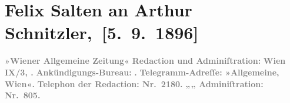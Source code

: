 

         
         \renewcommand{\erwaehntePersonen}{Personen: Ferdinand Raimund, Felix Salten, Julian Sternberg}
         \renewcommand{\erwaehnteInstitutionen}{Institutionen: Südbahnstrecke, Wiener Allgemeine Zeitung}
         \renewcommand{\erwaehnteOrte}{Orte: Raimund-Theater, Schulerstraße, Universitätsstraße, Wien}
         \renewcommand{\erwaehnteWerke}{Werke: Das Mädchen aus der Feenwelt oder Der Bauer als Millionär}
               \section[ Felix Salten an Arthur Schnitzler, {[}5. 9. 1896{]}]{ Felix Salten an Arthur Schnitzler, {[}5. 9. 1896{]}}\nopagebreak{}\rehead{ }\begin{ledgroupsized}[t]{13cm}\normalsize\beginnumbering \toendnotes[C]{\smallbreak\pagebreak[2]} 
\toendnotes[C]{\smallbreak}\pstart
           \noindent{}{\pb}\textcolor{gray}{\textbf{\textbf{»Wiener Allgemeine
                        Zeitung«}}}\pend
           \pstart
           \textcolor{gray}{\textbf{Redaction und Adminiſtration:}}\pend
           \pstart
           \textcolor{gray}{\textbf{Wien}}\pend
           \pstart
           \textcolor{gray}{\textbf{\textbf{IX}/3,{ }\textbf{}\textbf{.}}}\pend
           \pstart
           \textcolor{gray}{\textbf{Ankündigungs-Bureau:}}\pend
           \pstart
           \textcolor{gray}{\textbf{\textbf{.
                     }}}\pend
           \pstart
           \textcolor{gray}{\textbf{Telegramm-Adreſſe: »Allgemeine, Wien«.}}\pend
           \pstart
           \textcolor{gray}{\textbf{Telephon der Redaction: Nr. 2180.}}\pend
           \pstart
           \textcolor{gray}{\textbf{\hspace*{1.5em}„\hspace*{1.5em}„\hspace*{1.5em} Adminiſtration: Nr. 805.}}\pend

\end{ledgroupsized}
